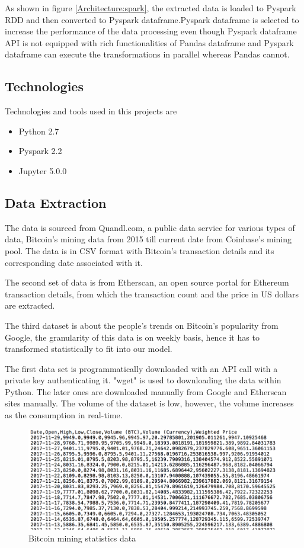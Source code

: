 \documentclass[sigconf]{acmart}
\begin{document}
As shown in figure \ref{Architecture:spark}, the extracted data is loaded to Pyspark RDD and then converted to Pyspark dataframe.Pyspark dataframe is selected to increase the performance of the data processing even though Pyspark dataframe API is not equipped with rich functionalities of Pandas dataframe and Pyspark dataframe can execute the transformations in parallel whereas Pandas cannot. 

\subsection{Technologies}
Technologies and tools used in this projects are
\begin{itemize}
\item Python 2.7 
\item Pyspark 2.2
\item Jupyter 5.0.0
\end{itemize}


\subsection{Data Extraction}
The data is sourced from Quandl.com, a public data service for various types of data, Bitcoin's mining data from 2015 till current date from Coinbase's mining pool. The data is in CSV format with Bitcoin's transaction details and its corresponding date associated with it.

The second set of data is from Etherscan, an open source portal for Ethereum transaction details, from which the transaction count and the price in US dollars are extracted.

The third dataset is about the people's trends on Bitcoin's popularity from Google, the granularity of this data is on weekly basis, hence it has to transformed statistically to fit into our model.

The first data set is programmatically downloaded with an API call with a private key authenticating it. "wget" is used to downloading the data within Python.
The later ones are downloaded manually from Google and Etherscan sites manually. The volume of the dataset is low, however, the volume increases as the consumption in real-time.

\begin{figure}[!ht]
  \centering\includegraphics[width=\columnwidth]{PROJECT/images/Source1data.png}
  \caption{Bitcoin mining statistics data}
  \label{}
\end{figure}
\end{document}

